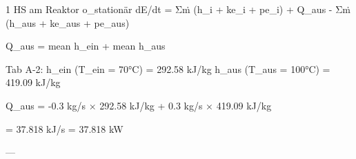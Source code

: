 1 HS am Reaktor  
o\_stationär  
dE/dt = Σṁ (h\_i + ke\_i + pe\_i) + Q\_aus - Σṁ (h\_aus + ke\_aus + pe\_aus)  

Q\_aus = mean h\_ein + mean h\_aus  

Tab A-2:  
h\_ein (T\_ein = 70°C) = 292.58 kJ/kg  
h\_aus (T\_aus = 100°C) = 419.09 kJ/kg  

Q\_aus = -0.3 kg/s × 292.58 kJ/kg + 0.3 kg/s × 419.09 kJ/kg  

= 37.818 kJ/s = 37.818 kW  

---